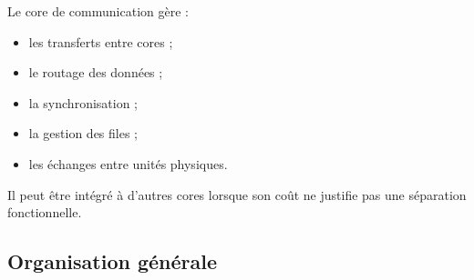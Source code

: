 \documentclass[11pt,a4paper]{article}
\begin{document}
Le core de communication gère :
\begin{itemize}
  \item les transferts entre cores ;
  \item le routage des données ;
  \item la synchronisation ;
  \item la gestion des files ;
  \item les échanges entre unités physiques.
\end{itemize}

Il peut être intégré à d'autres cores lorsque son coût ne justifie
pas une séparation fonctionnelle.

\subsection{Organisation générale}
\end{document}
